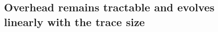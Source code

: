 \documentclass[10pt,journal,compsoc]{IEEEtran}
\newcommand{\pytracer}[0]{PyTracer\xspace}
\begin{document}







\subsection{Overhead remains tractable and evolves linearly with the trace size}
\end{document}
